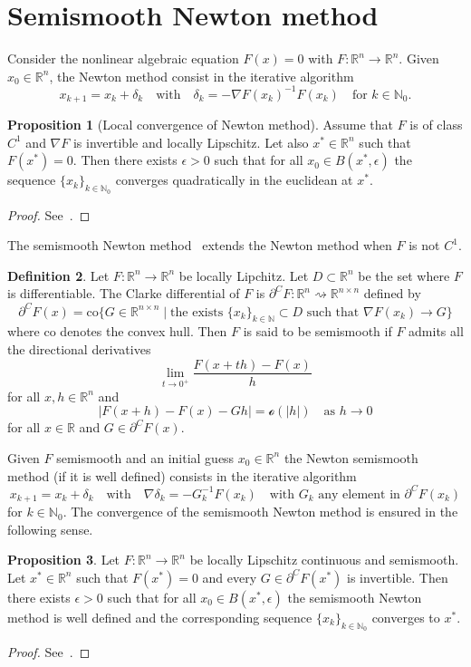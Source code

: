 \documentclass[a4paper,10pt,oneside]{amsbook}
\numberwithin{section}{chapter}
\numberwithin{equation}{chapter}
\theoremstyle{definition}
\newtheorem{prop}{Proposition}[chapter]
\newtheorem{defi}[prop]{Definition}
\begin{document}
\section{Semismooth Newton method}
\label{sec:seminewton}

Consider the nonlinear algebraic equation $F(x)=0$ with $F\colon\mathbb{R}^n\to\mathbb{R}^n$. Given $x_0\in\mathbb{R}^n$, the Newton method consist in the iterative algorithm
\[
x_{k+1}=x_k+\delta_k\quad\text{with}\quad\delta_k=-\nabla F(x_k)^{-1}F(x_k)\quad\text{for $k\in\mathbb{N}_0$}.
\]
\begin{prop}[Local convergence of Newton method]
Assume that $F$ is of class $C^1$ and $\nabla F$ is invertible and locally Lipschitz. Let also $x^*\in\mathbb{R}^n$ such that $F(x^*)=0$. Then there exists $\epsilon>0$ such that for all $x_0\in B(x^*,\epsilon)$ the sequence $\{x_k\}_{k\in\mathbb{N}_0}$ converges quadratically in the euclidean at $x^*$.
\end{prop}
\begin{proof}
See~\cite{hintermuller2011semismooth}.
\end{proof}
The semismooth Newton method~\cite{qi1993nonsmooth} extends the Newton method when $F$ is not $C^1$.
\begin{defi}
Let $F\colon\mathbb{R}^n\to\mathbb{R}^n$ be locally Lipchitz. Let $D\subset\mathbb{R}^n$ be the set where $F$ is differentiable. The Clarke differential of $F$ is $\partial^CF\colon\mathbb{R}^n\rightsquigarrow\mathbb{R}^{n\times n}$ defined by
\[
\partial^CF(x)=\text{co}\{G\in\mathbb{R}^{n\times n}\;|\;\text{the exists $\{x_k\}_{k\in\mathbb{N}}\subset D$ such that $\nabla F(x_k)\to G$}\}
\]
where $\text{co}$ denotes the convex hull. Then $F$ is said to be semismooth if $F$ admits all the directional derivatives
\[
\lim_{t\to 0^+}\frac{F(x+th)-F(x)}{h}
\]
for all $x,h\in\mathbb{R}^n$ and
\[
|F(x+h)-F(x)-Gh|=\mathscr{o}(|h|)\quad\text{as $h\to 0$}
\]
for all $x\in\mathbb{R}$ and $G\in\partial^C F(x)$.
\end{defi}
Given $F$ semismooth and an initial guess $x_0\in\mathbb{R}^n$ the Newton semismooth method (if it is well defined) consists in the iterative algorithm
\[
x_{k+1}=x_k+\delta_k\quad\text{with}\quad\nabla \delta_k=-G_k^{-1}F(x_k)\quad\text{with $G_k$ any element in $\partial^CF(x_k)$}
\]
for $k\in\mathbb{N}_0$. The convergence of the semismooth Newton method is ensured in the following sense.
\begin{prop}
Let $F\colon\mathbb{R}^n\to\mathbb{R}^n$ be locally Lipschitz continuous and semismooth. Let $x^*\in\mathbb{R}^n$ such that $F(x^*)=0$ and every $G\in\partial^C F(x^*)$ is invertible. Then there exists $\epsilon>0$ such that for all $x_0\in B(x^*,\epsilon)$ the semismooth Newton method is well defined and the corresponding sequence $\{x_k\}_{k\in\mathbb{N}_0}$ converges to $x^*$.
\end{prop}
\begin{proof}
See~\cite{hintermuller2011semismooth}.
\end{proof}
\end{document}
